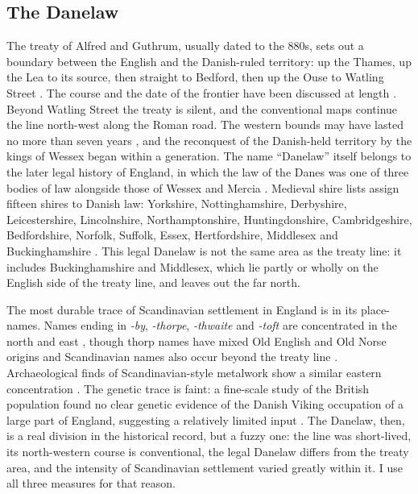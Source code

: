 \documentclass[11pt,a4paper]{article}
\begin{document}
\subsection{The Danelaw}
The treaty of Alfred and Guthrum, usually dated to the 880s, sets out a boundary between the English and the Danish-ruled territory: up the Thames, up the Lea to its source, then straight to Bedford, then up the Ouse to Watling Street \citep{dumville1992}. The course and the date of the frontier have been discussed at length \citep{davis1982,dumville1992,hart1992}. Beyond Watling Street the treaty is silent, and the conventional maps continue the line north-west along the Roman road. The western bounds may have lasted no more than seven years \citep{rochester2023}, and the reconquest of the Danish-held territory by the kings of Wessex began within a generation. The name ``Danelaw'' itself belongs to the later legal history of England, in which the law of the Danes was one of three bodies of law alongside those of Wessex and Mercia \citep{downer1972,wormald1999,abrams2008}. Medieval shire lists assign fifteen shires to Danish law: Yorkshire, Nottinghamshire, Derbyshire, Leicestershire, Lincolnshire, Northamptonshire, Huntingdonshire, Cambridgeshire, Bedfordshire, Norfolk, Suffolk, Essex, Hertfordshire, Middlesex and Buckinghamshire \citep{wikithreefold}. This legal Danelaw is not the same area as the treaty line: it includes Buckinghamshire and Middlesex, which lie partly or wholly on the English side of the treaty line, and leaves out the far north.

The most durable trace of Scandinavian settlement in England is in its place-names. Names ending in \emph{-by}, \emph{-thorpe}, \emph{-thwaite} and \emph{-toft} are concentrated in the north and east \citep{watts2004,gelling2000}, though thorp names have mixed Old English and Old Norse origins \citep{cullen2011} and Scandinavian names also occur beyond the treaty line \citep{fellowsjensen2014}. Archaeological finds of Scandinavian-style metalwork show a similar eastern concentration \citep{kershaw2013}. The genetic trace is faint: a fine-scale study of the British population found no clear genetic evidence of the Danish Viking occupation of a large part of England, suggesting a relatively limited input \citep{leslie2015}. The Danelaw, then, is a real division in the historical record, but a fuzzy one: the line was short-lived, its north-western course is conventional, the legal Danelaw differs from the treaty area, and the intensity of Scandinavian settlement varied greatly within it. I use all three measures for that reason.
\end{document}
